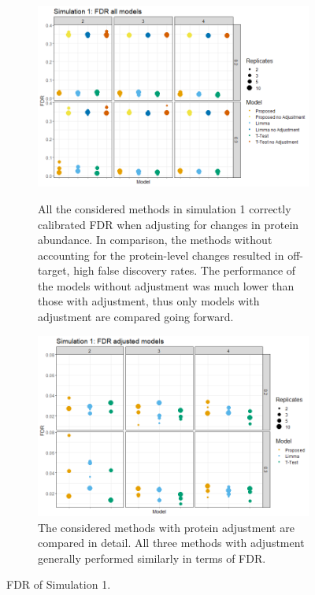 \documentclass{mcp}
\begin{document}
\begin{figure}[h!]
\centering
 \begin{subfigure}{\textwidth}
  \centering
	\includegraphics[width=.8\textwidth]{sim_new/sim1_FDR_all_models}\\
	\caption{All the considered methods in simulation 1 correctly calibrated FDR  when adjusting for changes in protein abundance. In comparison, the methods without accounting for the protein-level changes resulted in off-target, high false discovery rates. The performance of the models without adjustment was much lower than those with adjustment, thus only models with adjustment are compared going forward.}
 \end{subfigure}
 \begin{subfigure}{\textwidth}
  \centering
	\includegraphics[width=.8\textwidth]{sim_new/sim1_FDR}
	\caption{The considered methods with protein adjustment are compared in detail. All three methods with adjustment generally performed similarly in terms of FDR.}
 \end{subfigure}
 \caption{FDR of Simulation 1.}
\label{fig:sim1_fpr}
\end{figure}
\end{document}
